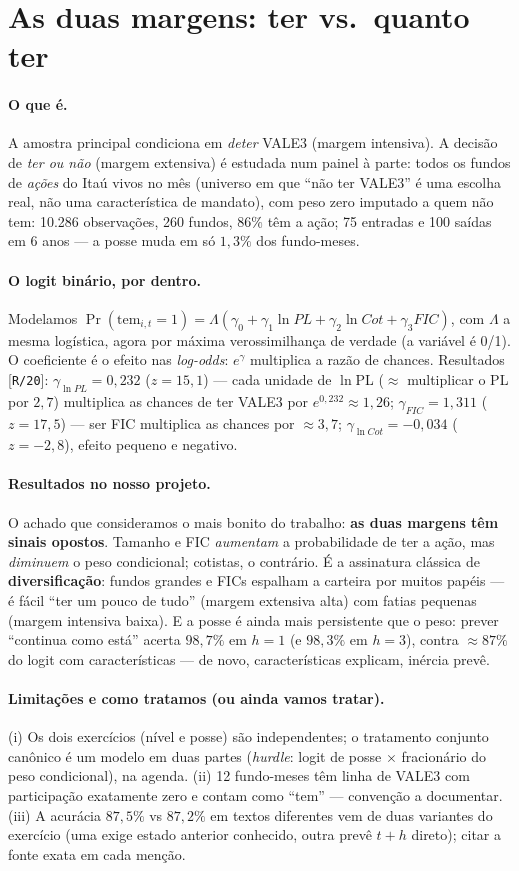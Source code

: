 \documentclass[11pt,a4paper]{article}
\newcommand{\oquee}[0]{\paragraph{O que é.}}
\newcommand{\resultados}[0]{\paragraph{Resultados no nosso projeto.}}
\newcommand{\limitacoes}[0]{\paragraph{Limitações e como tratamos (ou ainda vamos tratar).}}
\newcommand{\scriptref}[1]{{\footnotesize\color{cinza}[\texttt{#1}]}}
\begin{document}
\section{As duas margens: ter vs.\ quanto ter}
\label{sec:margens}

\oquee A amostra principal condiciona em \emph{deter} VALE3 (margem intensiva). A decisão de
\emph{ter ou não} (margem extensiva) é estudada num painel à parte: todos os fundos de
\emph{ações} do Itaú vivos no mês (universo em que ``não ter VALE3'' é uma escolha real, não uma
característica de mandato), com peso zero imputado a quem não tem: 10.286 observações, 260
fundos, $86\%$ têm a ação; 75 entradas e 100 saídas em 6 anos --- a posse muda em só $1{,}3\%$
dos fundo-meses.

\paragraph{O logit binário, por dentro.} Modelamos $\Pr(\text{tem}_{i,t}=1)=\Lambda(\gamma_0 +
\gamma_1\ln PL + \gamma_2\ln Cot + \gamma_3 FIC)$, com $\Lambda$ a mesma logística, agora por
máxima verossimilhança de verdade (a variável é 0/1). O coeficiente é o efeito nas
\emph{log-odds}: $e^{\gamma}$ multiplica a razão de chances. Resultados \scriptref{R/20}:
$\gamma_{\ln PL}=0{,}232$ ($z=15{,}1$) --- cada unidade de $\ln$PL ($\approx$ multiplicar o PL por
$2{,}7$) multiplica as chances de ter VALE3 por $e^{0{,}232}\approx1{,}26$;
$\gamma_{FIC}=1{,}311$ ($z=17{,}5$) --- ser FIC multiplica as chances por $\approx3{,}7$;
$\gamma_{\ln Cot}=-0{,}034$ ($z=-2{,}8$), efeito pequeno e negativo.

\resultados O achado que consideramos o mais bonito do trabalho: \textbf{as duas margens têm
sinais opostos}. Tamanho e FIC \emph{aumentam} a probabilidade de ter a ação, mas \emph{diminuem}
o peso condicional; cotistas, o contrário. É a assinatura clássica de \textbf{diversificação}:
fundos grandes e FICs espalham a carteira por muitos papéis --- é fácil ``ter um pouco de tudo''
(margem extensiva alta) com fatias pequenas (margem intensiva baixa). E a posse é ainda mais
persistente que o peso: prever ``continua como está'' acerta $98{,}7\%$ em $h=1$ (e $98{,}3\%$ em
$h=3$), contra $\approx87\%$ do logit com características --- de novo, características explicam,
inércia prevê.

\limitacoes (i) Os dois exercícios (nível e posse) são independentes; o tratamento conjunto
canônico é um modelo em duas partes (\emph{hurdle}: logit de posse $\times$ fracionário do peso
condicional), na agenda. (ii) 12 fundo-meses têm linha de VALE3 com participação exatamente zero
e contam como ``tem'' --- convenção a documentar. (iii) A acurácia $87{,}5\%$ vs $87{,}2\%$ em
textos diferentes vem de duas variantes do exercício (uma exige estado anterior conhecido, outra
prevê $t+h$ direto); citar a fonte exata em cada menção.
\end{document}

